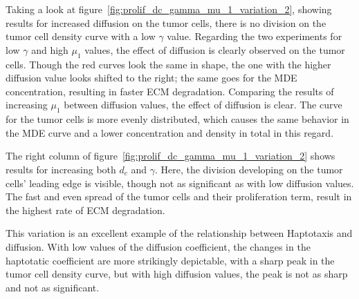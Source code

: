 Taking a look at figure~\ref{fig:prolif_dc_gamma_mu_1_variation_2}, showing results for increased diffusion on the tumor cells, there is no division on the tumor cell density curve with a low $\gamma$ value. Regarding the two experiments for low $\gamma$ and high $\mu_1$ values, the effect of diffusion is clearly observed on the tumor cells. Though the red curves look the same in shape, the one with the higher diffusion value looks shifted to the right; the same goes for the MDE concentration, resulting in faster ECM degradation. Comparing the results of increasing $\mu_1$ between diffusion values, the effect of diffusion is clear. The curve for the tumor cells is more evenly distributed, which causes the same behavior in the MDE curve and a lower concentration and density in total in this regard.

The right column of figure~\ref{fig:prolif_dc_gamma_mu_1_variation_2} shows results for increasing both $d_c$ and $\gamma$. Here, the division developing on the tumor cells' leading edge is visible, though not as significant as with low diffusion values. The fast and even spread of the tumor cells and their proliferation term, result in the highest rate of ECM degradation. 

This variation is an excellent example of the relationship between Haptotaxis and diffusion. With low values of the diffusion coefficient, the changes in the haptotatic coefficient are more strikingly depictable, with a sharp peak in the tumor cell density curve, but with high diffusion values, the peak is not as sharp and not as significant. 

